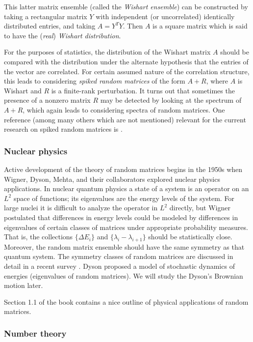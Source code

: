 \documentclass[letterpaper,11pt,oneside,reqno]{amsart}
\numberwithin{equation}{section}
\theoremstyle{definition}
\begin{document}
This latter matrix ensemble (called the \emph{Wishart ensemble})
can be constructed by taking a rectangular matrix $Y$ with independent (or uncorrelated) 
identically distributed entries, and taking $A=Y^{T}Y$. Then $A$ is a square matrix
which is said to have the (\emph{real}) \emph{Wishart distribution}. 

For the purposes of statistics, the distribution of the Wishart matrix $A$ should be 
compared with the distribution under the alternate hypothesis that the entries of the vector are correlated.
For certain assumed nature of the correlation structure, this leads to
considering \emph{spiked random matrices} of the form $A+R$, where $A$
is Wishart and $R$ is a finite-rank perturbation. It turns out that sometimes the 
presence of a nonzero matrix $R$ may be detected by looking at the spectrum of $A+R$,
which again leads to considering spectra of random matrices.
One reference (among many others which are not mentioned) 
relevant for the current research on spiked random matrices is
\cite{BBR2005phase}.

\subsubsection{Nuclear physics} 

Active development of the theory of random matrices begins in the 1950s when
Wigner, Dyson, Mehta, and their collaborators explored nuclear physics
applications.  In nuclear quantum physics a state of a system is an operator
on an $L^2$ space of functions; its eigenvalues are the energy levels of the
system.  For  large nuclei it is difficult to analyze the operator in $L^2$
directly, but Wigner postulated that differences in energy levels could be
modeled by differences in eigenvalues of certain classes of matrices under
appropriate probability measures. That is, the collections $\{\Delta E_i\}$
and $\{\lambda_i-\lambda_{i+1}\}$ should be statistically close. Moreover, the
random matrix ensemble should have the same symmetry as that quantum system.
The symmetry classes of random matrices are discussed in detail in a recent
survey \cite{Zirnbauer2010}. Dyson proposed a model of stochastic dynamics of
energies (eigenvalues of random matrices). We will study the Dyson's Brownian
motion later. 

Section 1.1 of the book \cite{mehta2004random} contains a nice outline of 
physical applications of random matrices.

\subsubsection{Number theory} 
\end{document}
